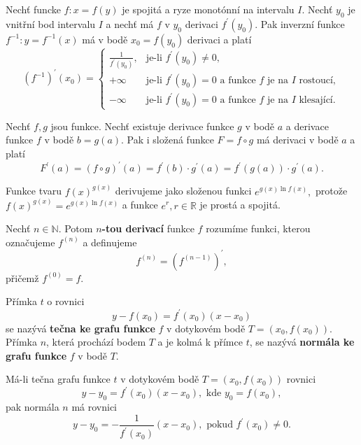 \begin{veta}
Nechť funcke $f:x=f(y)$ je spojitá a ryze monotónní na intervalu $I.$ Nechť $y_0$
je vnitřní bod intervalu $I$ a nechť má $f$ v $y_0$ derivaci $f^\prime(y_0).$
Pak inverzní funkce $f^{-1}:y=f^{-1}(x)$ má v bodě $x_0=f(y_0)$ derivaci a platí
$$
\left ( f^{-1} \right )^\prime(x_0)= \begin{cases}
\frac{1}{f^\prime(y_0)}, & \textrm{je-li } f^\prime(y_0)\ne 0,\\
+\infty & \textrm{je-li } f^\prime (y_0)=0 \textrm{ a funkce } f \textrm{ je na } I \textrm{ rostoucí},\\
-\infty & \textrm{je-li } f^\prime (y_0)=0 \textrm{ a funkce } f \textrm{ je na } I \textrm{ klesající}.
\end{cases}
$$
\end{veta}

\begin{veta}
Nechť $f, g$ jsou funkce. Nechť existuje derivace funkce $g$ v bodě $a$ a
derivace funkce $f$ v bodě $b=g(a).$ Pak i složená funkce $F=f\circ g$ má derivaci
v bodě $a$ a platí
$$F^\prime(a)=(f\circ g)^\prime (a) = f^\prime(b)\cdot g^\prime(a)=f^\prime(g(a))\cdot g^\prime(a).$$
\end{veta}

\begin{pozn}
    Funkce tvaru $f(x)^{g(x)}$ derivujeme jako složenou funkci $e^{g(x)\ln f(x)},$
    protože $f(x)^{g(x)}=e^{g(x)\ln f(x)}$ a funkce $e^r, r \in \mathbb R$ je prostá
    a spojitá.
\end{pozn}

\begin{definition}
Nechť $n \in \mathbb N$. Potom \textbf{$n$-tou derivací} funkce $f$ rozumíme funkci,
kterou označujeme $f^{(n)}$ a definujeme
$$f^{(n)}=\left ( f^{(n-1)} \right )^\prime, $$
přičemž $f^{(0)}=f.$
\end{definition}

\begin{definition}
Přímka $t$ o rovnici
$$y-f(x_0)=f^\prime(x_0)(x-x_0)$$
se nazývá \textbf{tečna ke grafu funkce} $f$ v dotykovém bodě $T=(x_0,f(x_0))$.
Přímka $n$, která prochází bodem $T$ a je kolmá k přímce $t$, se nazývá \textbf{normála
ke grafu funkce} $f$ v bodě $T.$
\end{definition}

\begin{veta}
    Má-li tečna grafu funkce $t$ v dotykovém bodě $T=(x_0, f(x_0))$ rovnici
    $$y-y_0=f^\prime(x_0)(x-x_0), \textrm{ kde } y_0=f(x_0),$$
    pak normála $n$ má rovnici
    $$y-y_0=-\frac{1}{f^\prime(x_0)}(x-x_0), \textrm{ pokud } f^\prime(x_0)\ne 0.$$
\end{veta}

